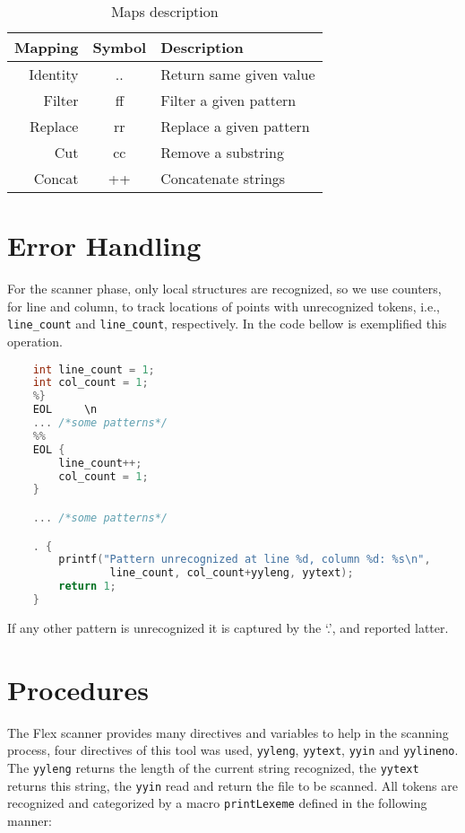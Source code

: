 \documentclass{article}
\begin{document}
\begin{table}[ht]
\centering
\caption{Maps description}
\label{tab:maps}
\begin{tabular}{|r|c|l|}
\hline
Mapping   & Symbol & Description\\ \hline
Identity  & ..     & Return same given value \\
Filter    & ff     & Filter a given pattern \\
Replace   & rr     & Replace a given pattern \\
Cut       & cc     & Remove a substring \\
Concat    & ++     & Concatenate strings \\
\hline
\end{tabular}
\end{table}

\section{Error Handling}
For the scanner phase, only local structures are recognized, so we use counters,
for line and column, to track locations of points with unrecognized tokens,
i.e., \texttt{line_count} and \texttt{line_count}, respectively. In the
code bellow is exemplified this operation.

\begin{lstlisting}[language=C, caption=Exemplo de código para monitorar linhas e colunas.]
    %{
    int line_count = 1;
    int col_count = 1;
    %}
    EOL     \n
    ... /*some patterns*/
    %%
    EOL {
        line_count++;
        col_count = 1;
    }

    ... /*some patterns*/

    . {
        printf("Pattern unrecognized at line %d, column %d: %s\n",
                line_count, col_count+yyleng, yytext);
        return 1;
    }
\end{lstlisting}

If any other pattern is unrecognized it is captured by the `.', and reported
latter.

\section{Procedures}
The Flex scanner provides many directives and variables to help in the scanning
process, four directives of this tool was used, \texttt{yyleng},
\texttt{yytext}, \texttt{yyin} and \texttt{yylineno}. The \texttt{yyleng}
returns the length of the current string recognized, the \texttt{yytext}
returns this string, the \texttt{yyin} read and return the file to be scanned.
All tokens are recognized and categorized by a macro \texttt{printLexeme}
defined in the following manner:
\end{document}
